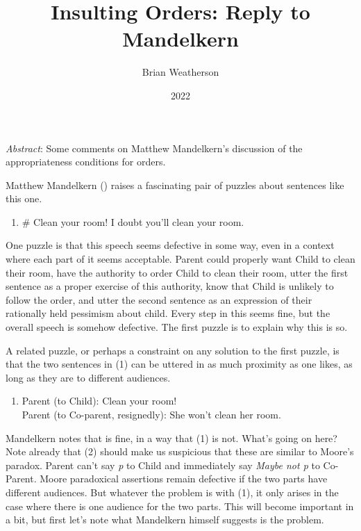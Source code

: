 \documentclass[
  11pt,
  letterpaper,
  DIV=11,
  numbers=noendperiod,
  twoside]{scrartcl}
\title{Insulting Orders: Reply to Mandelkern}
\author{Brian Weatherson}
\date{2022}
\providecommand{\tightlist}{%
  \setlength{\itemsep}{0pt}\setlength{\parskip}{0pt}}\usepackage{longtable,booktabs,array}
\renewenvironment{abstract}
 {\vspace{-1.25cm}
 \quotation\small\noindent\emph{Abstract}:}
 {\endquotation}
\begin{document}
\maketitle
\begin{abstract}
Some comments on Matthew Mandelkern's discussion of the appropriateness
conditions for orders.
\end{abstract}


Matthew Mandelkern () raises a
fascinating pair of puzzles about sentences like this one.

\begin{enumerate}
\def\labelenumi{(\arabic{enumi})}
\tightlist
\item
  \# Clean your room! I doubt you'll clean your room.
\end{enumerate}

One puzzle is that this speech seems defective in some way, even in a
context where each part of it seems acceptable. Parent could properly
want Child to clean their room, have the authority to order Child to
clean their room, utter the first sentence as a proper exercise of this
authority, know that Child is unlikely to follow the order, and utter
the second sentence as an expression of their rationally held pessimism
about child. Every step in this seems fine, but the overall speech is
somehow defective. The first puzzle is to explain why this is so.

A related puzzle, or perhaps a constraint on any solution to the first
puzzle, is that the two sentences in (1) can be uttered in as much
proximity as one likes, as long as they are to different audiences.

\begin{enumerate}
\def\labelenumi{(\arabic{enumi})}
\setcounter{enumi}{1}
\tightlist
\item
  Parent (to Child): Clean your room!\\
  Parent (to Co-parent, resignedly): She won't clean her room.
\end{enumerate}

Mandelkern notes that is fine, in a way that (1) is not. What's going on
here? Note already that (2) should make us suspicious that these are
similar to Moore's paradox. Parent can't say \emph{p} to Child and
immediately say \emph{Maybe not p} to Co-Parent. Moore paradoxical
assertions remain defective if the two parts have different audiences.
But whatever the problem is with (1), it only arises in the case where
there is one audience for the two parts. This will become important in a
bit, but first let's note what Mandelkern himself suggests is the
problem.
\end{document}
